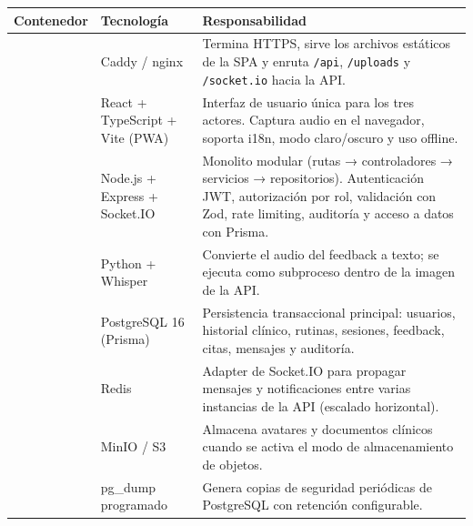 \begin{longtable}{L{3.5cm} L{3cm} L{8cm}}
  \toprule
  \textbf{\color{fmAccent}Contenedor} &
  \textbf{\color{fmAccent}Tecnología} &
  \textbf{\color{fmAccent}Responsabilidad} \\
  \midrule
  \endhead

   &
  Caddy / nginx &
  Termina HTTPS, sirve los archivos estáticos de la SPA y enruta \texttt{/api}, \texttt{/uploads} y \texttt{/socket.io} hacia la API. \\

   &
  React + TypeScript + Vite (PWA) &
  Interfaz de usuario única para los tres actores. Captura audio en el navegador, soporta i18n, modo claro/oscuro y uso offline. \\

   &
  Node.js + Express + Socket.IO &
  Monolito modular (rutas → controladores → servicios → repositorios). Autenticación JWT, autorización por rol, validación con Zod, rate limiting, auditoría y acceso a datos con Prisma. \\

   &
  Python + Whisper &
  Convierte el audio del feedback a texto; se ejecuta como subproceso dentro de la imagen de la API. \\

   &
  PostgreSQL 16 (Prisma) &
  Persistencia transaccional principal: usuarios, historial clínico, rutinas, sesiones, feedback, citas, mensajes y auditoría. \\

   &
  Redis &
  Adapter de Socket.IO para propagar mensajes y notificaciones entre varias instancias de la API (escalado horizontal). \\

   &
  MinIO / S3 &
  Almacena avatares y documentos clínicos cuando se activa el modo de almacenamiento de objetos. \\

   &
  pg\_dump programado &
  Genera copias de seguridad periódicas de PostgreSQL con retención configurable. \\

  \bottomrule
\end{longtable}

